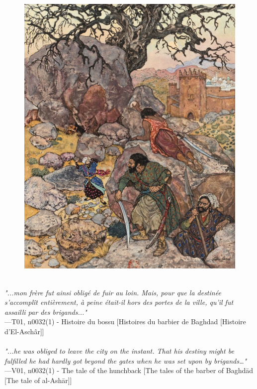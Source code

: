 \documentclass[../Carre_nights.tex]{subfiles}
\begin{document}
\begin{figure}[ht]
\centering
\includegraphics[height=\figsize]{illustrations/volume_1/T01, n0032(1) - Histoire du bossu [Histoires du barbier de Baghdad [Histoire d’El-Aschâr]].jpg}
\end{figure}

\textit{\\
"...mon frère fut ainsi obligé de fuir au loin. Mais, pour que la destinée s’accomplît entièrement, à peine était-il hors des portes de la ville, qu’il fut assailli par des brigands..."} \\
—T01, n0032(1) - Histoire du bossu [Histoires du barbier de Baghdad [Histoire d’El-Aschâr]] \\~\\
\textit{"...he was obliged to leave the city on the instant. That his destiny might be fulfilled he had hardly got beyond the gates when he was set upon by brigands…"} \\
—V01, n0032(1) - The tale of the hunchback [The tales of the barber of Baghd\=ad [The tale of al-Ash\=ar]]
\end{document}
